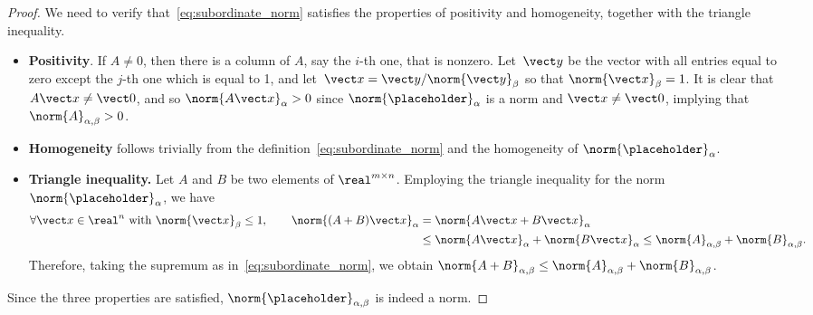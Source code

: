 \begin{proof}
    We need to verify that~\eqref{eq:subordinate_norm} satisfies the properties of positivity and homogeneity,
    together with the triangle inequality.
    \begin{itemize}
        \item
            \textbf{Positivity}. If $A \neq 0$,
            then there is a column of $A$, say the $i$-th one, that is nonzero.
            Let~$\vect y$ be the vector with all entries equal to zero except the $j$-th one which is equal to 1,
            and let~$\vect x = \vect y / \norm{\vect y}_{\beta}$ so that $\norm{\vect x}_{\beta} = 1$.
            It is clear that $A \vect x \neq \vect 0$,
            and so $\norm{A \vect x}_{\alpha} > 0$ since $\norm{\placeholder}_{\alpha}$ is a norm and $\vect x \neq \vect 0$,
            implying that $\norm{A}_{\alpha,\beta} > 0$.

        \item
            \textbf{Homogeneity} follows trivially from the definition~\eqref{eq:subordinate_norm}
            and the homogeneity of $\norm{\placeholder}_{\alpha}$.

        \item
            \textbf{Triangle inequality.}
            Let $A$ and $B$ be two elements of $\real^{m \times n}$.
            Employing the triangle inequality for the norm $\norm{\placeholder}_{\alpha}$,
            we have
            \begin{align*}
                \forall \vect x \in \real^{n} ~ \text{with} ~ \norm{\vect x}_{\beta}\leq 1, \qquad
                \norm{(A + B) \vect x}_{\alpha}
                &= \norm{A \vect x + B \vect x}_{\alpha} \\
                &\leq \norm{A \vect x}_{\alpha} + \norm{B \vect x}_{\alpha}
                \leq \norm{A}_{\alpha,\beta} + \norm{B}_{\alpha,\beta}.
            \end{align*}
            Therefore, taking the supremum as in~\eqref{eq:subordinate_norm},
            we obtain $\norm{A+B}_{\alpha,\beta} \leq \norm{A}_{\alpha,\beta} + \norm{B}_{\alpha,\beta}$.
    \end{itemize}
    Since the three properties are satisfied, $\norm{\placeholder}_{\alpha,\beta}$ is indeed a norm.
\end{proof}

